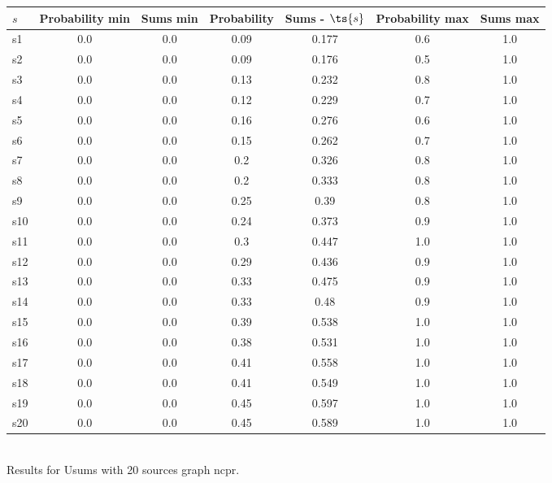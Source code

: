 \documentclass{article}
\begin{document}
\noindent\begin{tabular}{|l|c|c|c|c|c|c|}
\hline
$s$& Probability min & Sums min & Probability & Sums - $\ts{s}$ & Probability max & Sums max\\
\hline
s1 &0.0 & 0.0 & 0.09 & 0.177 & 0.6 & 1.0\\
\hline
s2 &0.0 & 0.0 & 0.09 & 0.176 & 0.5 & 1.0\\
\hline
s3 &0.0 & 0.0 & 0.13 & 0.232 & 0.8 & 1.0\\
\hline
s4 &0.0 & 0.0 & 0.12 & 0.229 & 0.7 & 1.0\\
\hline
s5 &0.0 & 0.0 & 0.16 & 0.276 & 0.6 & 1.0\\
\hline
s6 &0.0 & 0.0 & 0.15 & 0.262 & 0.7 & 1.0\\
\hline
s7 &0.0 & 0.0 & 0.2 & 0.326 & 0.8 & 1.0\\
\hline
s8 &0.0 & 0.0 & 0.2 & 0.333 & 0.8 & 1.0\\
\hline
s9 &0.0 & 0.0 & 0.25 & 0.39 & 0.8 & 1.0\\
\hline
s10 &0.0 & 0.0 & 0.24 & 0.373 & 0.9 & 1.0\\
\hline
s11 &0.0 & 0.0 & 0.3 & 0.447 & 1.0 & 1.0\\
\hline
s12 &0.0 & 0.0 & 0.29 & 0.436 & 0.9 & 1.0\\
\hline
s13 &0.0 & 0.0 & 0.33 & 0.475 & 0.9 & 1.0\\
\hline
s14 &0.0 & 0.0 & 0.33 & 0.48 & 0.9 & 1.0\\
\hline
s15 &0.0 & 0.0 & 0.39 & 0.538 & 1.0 & 1.0\\
\hline
s16 &0.0 & 0.0 & 0.38 & 0.531 & 1.0 & 1.0\\
\hline
s17 &0.0 & 0.0 & 0.41 & 0.558 & 1.0 & 1.0\\
\hline
s18 &0.0 & 0.0 & 0.41 & 0.549 & 1.0 & 1.0\\
\hline
s19 &0.0 & 0.0 & 0.45 & 0.597 & 1.0 & 1.0\\
\hline
s20 &0.0 & 0.0 & 0.45 & 0.589 & 1.0 & 1.0\\
\hline
\end{tabular}\\

\noindent Results for Usums with 20 sources graph ncpr.
\end{document}
